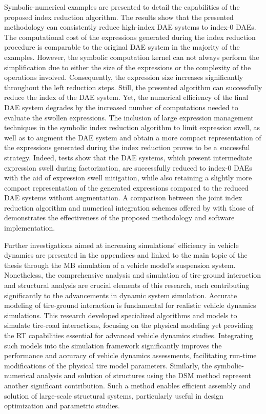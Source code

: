 Symbolic-numerical examples are presented to detail the capabilities of the proposed index reduction algorithm. The results show that the presented methodology can consistently reduce high-index \ac{DAE} systems to index-0 \acp{DAE}. The computational cost of the expressions generated during the index reduction procedure is comparable to the original \ac{DAE} system in the majority of the examples. However, the \Maple{} symbolic computation kernel can not always perform the simplification due to either the size of the expressions or the complexity of the operations involved. Consequently, the expression size increases significantly throughout the left reduction steps. Still, the presented algorithm can successfully reduce the index of the \ac{DAE} system. Yet, the numerical efficiency of the final \ac{DAE} system degrades by the increased number of computations needed to evaluate the swollen expressions. The inclusion of large expression management techniques in the symbolic index reduction algorithm to limit expression swell, as well as to augment the \ac{DAE} system and obtain a more compact representation of the expressions generated during the index reduction proves to be a successful strategy. Indeed, tests show that the \ac{DAE} systems, which present intermediate expression swell during factorization, are successfully reduced to index-0 \acp{DAE} with the aid of expression swell mitigation, while also retaining a slightly more compact representation of the generated expressions compared to the reduced \ac{DAE} systems without augmentation. A comparison between the joint index reduction algorithm and numerical integration schemes offered by \Maple{} with those of \Indigo{} demonstrates the effectiveness of the proposed methodology and software implementation.

Further investigations aimed at increasing simulations' efficiency in vehicle dynamics are presented in the appendices and linked to the main topic of the thesis through the \ac{MB} simulation of a vehicle model's suspension system. Nonetheless, the comprehensive analysis and simulation of tire-ground interaction and structural analysis are crucial elements of this research, each contributing significantly to the advancements in dynamic system simulation. Accurate modeling of tire-ground interaction is fundamental for realistic vehicle dynamics simulations. This research developed specialized algorithms and models to simulate tire-road interactions, focusing on the physical modeling yet providing the \ac{RT} capabilities essential for advanced vehicle dynamics studies. Integrating such models into the simulation framework significantly improves the performance and accuracy of vehicle dynamics assessments, facilitating run-time modifications of the physical tire model parameters. Similarly, the symbolic-numerical analysis and solution of structures using the \ac{DSM} method represent another significant contribution. Such a method enables efficient assembly and solution of large-scale structural systems, particularly useful in design optimization and parametric studies.

